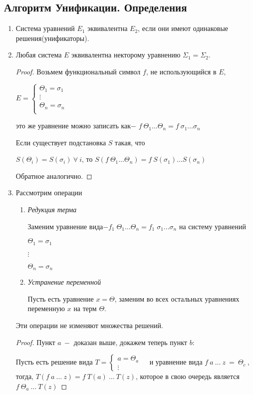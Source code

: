 		\subsection{Алгоритм Унификации. Определения}
		\begin{enumerate}
			\item Система уравнений $E_1$ эквивалентна $E_2$, если они имеют одинаковые решения(унификаторы).
			\item Любая система $E$ эквивалентна некторому уравнению $\Sigma_1=\Sigma_2$.

	\begin{proof}
		Возьмем функциональный символ $f$, не использующийся в $E$, \par
		$
		E=\begin{cases}
			\Theta_1=\sigma_1&\\
			\vdots&\\
			\Theta_n=\sigma_n&\\
		\end{cases}
		$\par
		это же уравнение можно записать как$-$ $f\:\Theta_1\hdots\Theta_n=f\:\sigma_1 \hdots\sigma_n$\par
		Если существует подстановка $S$ такая, что\par $S(\Theta_i)=S(\sigma_i)\:\forall\:i$,
		то $S(f\:\Theta_1\hdots\Theta_n)=f\:S(\sigma_1)\hdots S(\sigma_n)$ \par Обратное аналогично.\end{proof}
		\item Рассмотрим операции
		\begin{enumerate}
			\item \textit{Редукция терма} \par
					Заменим уравнение вида$-f_1\;\Theta_1 \hdots\Theta_n=f_1\;\sigma_1\hdots\sigma_n$ на систему уравнений\par$\Theta_1=\sigma_1$\par$\vdots$\par$\Theta_n=\sigma_n$
			\item \textit{Устранение переменной} \par
			Пусть есть уравнение $x=\Theta$, заменим во всех остальных уравнениях переменную $x$ на терм $\Theta$.
		\end{enumerate}
		\begin{statement} Эти операции не изменяют множества решений.
		\end{statement}
		\begin{proof} Пункт $a\:-$ доказан выше, докажем теперь пункт $b:$\par Пусть есть решение вида $T = \begin{cases} a = \Theta_a &\\ \vdots \end{cases}$
		и уравнение вида $f\:a\:\hdots\:z\:=\:\Theta_c\:$, тогда, $T(f\:a\:\hdots\:z) = f\:T(a)\:\hdots\:T(z)$, которое в свою очередь является $f\: \Theta_a\:\hdots\:T(z)$
		\end{proof}
	\end{enumerate}	
